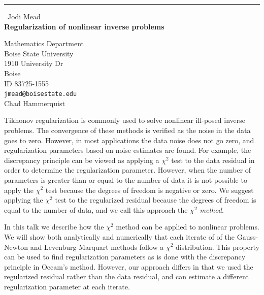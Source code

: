 \documentclass{report}
\begin{document}
\begin{center}
\rule{6in}{1pt} \
{\large Jodi Mead \\
{\bf Regularization of nonlinear inverse problems}}

Mathematics Department \\ Boise State University \\ 1910 University Dr \\ Boise \\ ID 83725-1555
\\
{\tt jmead@boisestate.edu}\\
Chad Hammerquist\end{center}

Tikhonov regularization is commonly used to solve nonlinear ill-posed
inverse problems. The convergence of these methods is verified as the
noise in the data goes to zero. However, in most applications the data
noise does not go zero, and regularization parameters based on noise
estimates are found. For example, the discrepancy principle can be viewed
as applying a $\chi^2$ test to the data residual in order to determine
the regularization parameter. However, when the number of parameters is
greater than or equal to the number of data it is not possible to apply
the $\chi^2$ test because the degrees of freedom is negative or zero. We
suggest applying the $\chi^2$ test to the regularized residual because
the degrees of freedom is equal to the number of data, and we call this
approach the {\it $\chi^2$ method}.

In this talk we describe how the $\chi^2$ method can be applied to
nonlinear problems. We will show both analytically and numerically that
each iterate of of the Gauss-Newton and Levenburg-Marquart methods follow
a $\chi^2$ distribution. This property can be used to find regularization
parameters as is done with the discrepancy principle in Occam's method.
However, our approach differs in that we used the regularized residual
rather than the data residual, and can estimate a different
regularization parameter at each iterate.
\end{document}
